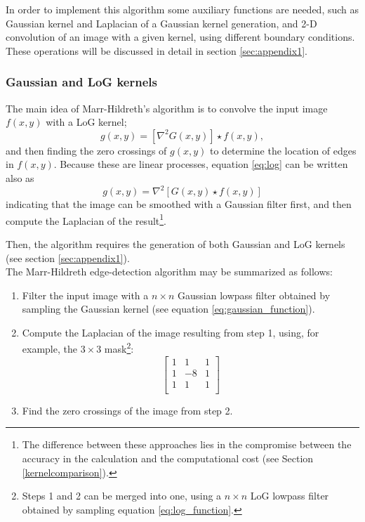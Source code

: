 \documentclass{ipol}
\numberwithin{equation}{section}
\numberwithin{table}{section}
\begin{document}
In order to implement this algorithm some auxiliary functions are needed, such as Gaussian kernel and Laplacian of a Gaussian 
kernel generation, and 2-D convolution of an image with a given kernel, 
using different boundary conditions. These operations will be discussed 
in detail in section \ref{sec:appendix1}.


\subsubsection{Gaussian and LoG kernels}

The main idea of Marr-Hildreth's algorithm is to convolve the input image $f(x,y)$ with a LoG kernel;
\begin{equation}\label{eq:log}
  g(x,y) = [\nabla^2G(x,y)]\star f(x,y), 
\end{equation}
and then finding the zero crossings of $g(x,y)$ to determine the location of edges in $f(x,y)$. 
Because these are linear processes, equation \ref{eq:log} can be written also as
\begin{equation}
  g(x,y) = \nabla^2[G(x,y)\star f(x,y)]
\end{equation}
indicating that the image can be smoothed with a Gaussian filter first, and then compute the Laplacian of the result\footnote{The difference between these approaches lies in the compromise between the accuracy in the calculation and the computational cost (see Section \ref{kernelcomparison}).}.

Then, the algorithm requires the generation of both Gaussian and LoG kernels (see section \ref{sec:appendix1}).\\

The Marr-Hildreth edge-detection algorithm may be summarized as follows:
\begin{enumerate}
	\item Filter the input image with a $n \times n$ Gaussian lowpass filter obtained by sampling the Gaussian kernel (see equation \ref{eq:gaussian_function}). %
	\item Compute the Laplacian of the image resulting from step 1, using, for example, the $3\times3$ mask\footnote{Steps 1 and 2 can be merged into one, using a $n\times n$ LoG lowpass filter obtained by sampling equation \ref{eq:log_function}.}:
	\begin{equation}
		\begin{bmatrix}
			1 &  1 & 1 \\
			1 & -8 & 1 \\
			1 &  1 & 1 \\
		\end{bmatrix}
		\label{eq:laplacian:mask}
	\end{equation}
	\item Find the zero crossings of the image from step 2.
\end{enumerate}
\end{document}
